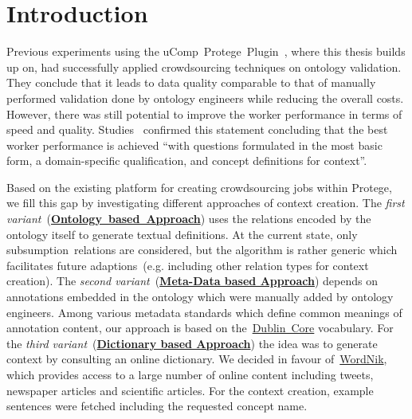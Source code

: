 \section{Introduction}\label{sec:approaches_introduction}
Previous experiments using the uComp~Protege~Plugin~\cite{wohlgenannt2016}, where this thesis builds up on, had successfully applied crowdsourcing techniques on ontology validation. They conclude that it leads to data quality comparable to that of manually performed validation done by ontology engineers while reducing the overall costs. However, there was still potential to improve the worker performance in terms of speed and quality. 
Studies~\cite{mortensen2013} confirmed this statement concluding that the best worker performance is achieved
\enquote{with questions formulated in the most basic form, a domain-specific qualification, and concept definitions for context}.

Based on the existing platform for creating crowdsourcing jobs within Protege, we fill this gap by investigating different approaches of context creation.
The \emph{first variant}~(\hyperref[sec:enrichment_ontology_approach]{\textbf{Ontology~based~Approach}}) uses the relations encoded by the ontology itself to generate textual definitions. At the current state, only subsumption~relations are considered, but the algorithm is rather generic which facilitates future adaptions~(e.g. including other relation types for context creation).
The \emph{second variant}~(\hyperref[sec:enrichment_metaData_approach]{\textbf{Meta-Data based Approach}}) depends on annotations embedded in the ontology which were manually added by ontology engineers. Among various metadata standards which define common meanings of annotation content, our approach is based on the~\hyperref[sec:dublin_core_metadata_vocabulary]{Dublin~Core} vocabulary.
For the \emph{third variant}~(\hyperref[sec:enrichment_dictionary_approach]{\textbf{Dictionary based Approach}}) the idea was to generate context by consulting an online dictionary. We decided in favour of~\hyperref[sec:wordnik]{WordNik}, which provides access to a large number of online content including tweets, newspaper articles and scientific articles. For the context creation, example sentences were fetched including the requested concept name. 